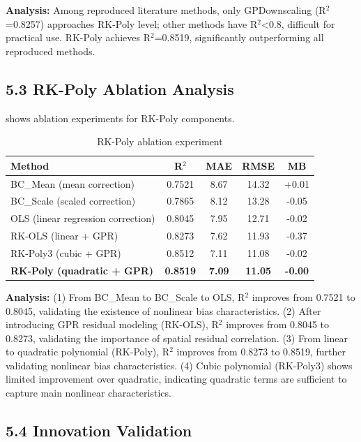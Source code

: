\documentclass[a4paper]{article}
\begin{document}
\textbf{Analysis:} Among reproduced literature methods, only GPDownscaling (R$^2$=0.8257) approaches RK-Poly level; other methods have R$^2$<0.8, difficult for practical use. RK-Poly achieves R$^2$=0.8519, significantly outperforming all reproduced methods.

\subsection{5.3 RK-Poly Ablation Analysis}

 shows ablation experiments for RK-Poly components.

\begin{table}[h]
\centering
\caption{RK-Poly ablation experiment}
\label{tab:ablation}
\begin{tabular}{lcccc}
\toprule
Method & R$^2$ & MAE & RMSE & MB \\
\midrule
BC\_Mean (mean correction) & 0.7521 & 8.67 & 14.32 & +0.01 \\
BC\_Scale (scaled correction) & 0.7865 & 8.12 & 13.28 & -0.05 \\
OLS (linear regression correction) & 0.8045 & 7.95 & 12.71 & -0.02 \\
RK-OLS (linear + GPR) & 0.8273 & 7.62 & 11.93 & -0.37 \\
RK-Poly3 (cubic + GPR) & 0.8512 & 7.11 & 11.08 & -0.02 \\
\textbf{RK-Poly (quadratic + GPR)} & \textbf{0.8519} & \textbf{7.09} & \textbf{11.05} & \textbf{-0.00} \\
\bottomrule
\end{tabular}
\end{table}

\textbf{Analysis:} (1) From BC\_Mean to BC\_Scale to OLS, R$^2$ improves from 0.7521 to 0.8045, validating the existence of nonlinear bias characteristics. (2) After introducing GPR residual modeling (RK-OLS), R$^2$ improves from 0.8045 to 0.8273, validating the importance of spatial residual correlation. (3) From linear to quadratic polynomial (RK-Poly), R$^2$ improves from 0.8273 to 0.8519, further validating nonlinear bias characteristics. (4) Cubic polynomial (RK-Poly3) shows limited improvement over quadratic, indicating quadratic terms are sufficient to capture main nonlinear characteristics.

\subsection{5.4 Innovation Validation}
\end{document}
